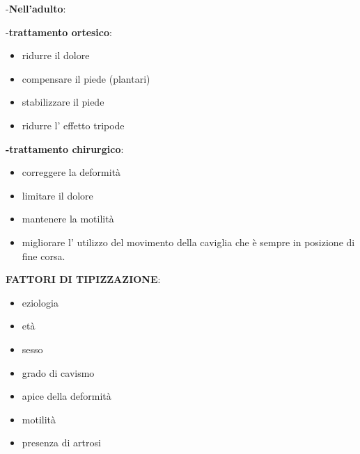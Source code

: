 \documentclass[]{article}
\begin{document}
-\textbf{Nell'adulto}:~

-\textbf{trattamento ortesico}:

\begin{itemize}
\item
  ridurre il dolore
\item
  compensare il piede (plantari)
\item
  stabilizzare il piede
\item
  ridurre l' effetto tripode
\end{itemize}

\textbf{-trattamento chirurgico}:~

\begin{itemize}
\item
  correggere la deformità
\item
  limitare il dolore
\item
  mantenere la motilità
\item
  migliorare l' utilizzo del movimento della caviglia che è sempre in
  posizione di fine corsa.
\end{itemize}

\textbf{FATTORI DI TIPIZZAZIONE}:

\begin{itemize}
\item
  eziologia
\item
  età~
\item
  sesso~
\item
  grado di cavismo
\item
  apice della deformità
\item
  motilità
\item
  presenza di artrosi
\end{itemize}
\end{document}
